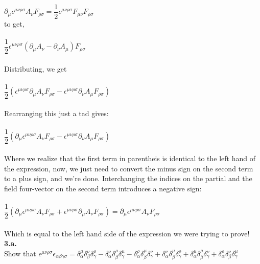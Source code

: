 \documentclass[prb,preprint]
{revtex4-1}
\newcommand{\PRLsep}{\noindent\makebox[\linewidth]{\resizebox{0.8888\linewidth}{2pt}{$\bullet$}}\bigskip}
\begin{document}
\\
$\partial_\mu \epsilon^{\mu\nu\rho\sigma}A_\nu F_{\rho\sigma} = \dfrac{1}{2}\epsilon^{\mu\nu\rho\sigma}F_{\mu\nu}F_{\rho\sigma}$
\\
to get, 
\\
\\
$\dfrac{1}{2}\epsilon^{\mu\nu\rho\sigma} \left(\partial_\mu A_\nu - \partial_\nu A_\mu\right)F_{\rho\sigma}$
\\
\\
Distributing, we get
\\
\\
$\dfrac{1}{2} \left(\epsilon^{\mu\nu\rho\sigma} \partial_\mu A_\nu F_{\rho\sigma} - \epsilon^{\mu\nu\rho\sigma} \partial_\nu A_\mu F_{\rho\sigma}\right)$
\\
\\
Rearranging this just a tad gives:
\\
\\
$\dfrac{1}{2} \left(\partial_\mu \epsilon^{\mu\nu\rho\sigma}  A_\nu F_{\rho\sigma} - \epsilon^{\mu\nu\rho\sigma} \partial_\nu A_\mu F_{\rho\sigma}\right)$
\\
\\
Where we realize that the first term in parentheis is identical to the left hand of the expression, now, we just need to convert the minus sign on the second term to a plus sign, and we're done.  Interchanging the indices on the partial and the field four-vector on the second term introduces a negative sign:
\\
\\
$\dfrac{1}{2} \left(\partial_\mu \epsilon^{\mu\nu\rho\sigma}  A_\nu F_{\rho\sigma} + \epsilon^{\mu\nu\rho\sigma} \partial_\mu A_\nu F_{\rho\sigma}\right) = \partial_\mu \epsilon^{\mu\nu\rho\sigma}A_\nu F_{\rho\sigma}$
\\
\\
Which is equal to the left hand side of the expression we were trying to prove!
\\
\PRLsep
\newpage
\textbf{3.a.}
\\
Show that $\epsilon^{\mu\nu\rho\sigma}\epsilon_{\alpha\beta\gamma\sigma} = \delta^\mu_\alpha \delta^\nu_\beta \delta^\rho_\gamma - \delta^\nu_\alpha \delta^\rho_\beta \delta^\mu_\gamma - \delta^\rho_\alpha \delta^\mu_\beta \delta^\nu_\gamma + \delta^\nu_\alpha \delta^\mu_\beta \delta^\rho_\gamma + \delta^\mu_\alpha \delta^\rho_\beta \delta^\nu_\gamma + \delta^\rho_\alpha \delta^\nu_\beta \delta^\mu_\gamma$ 
\\
\\
\end{document}
